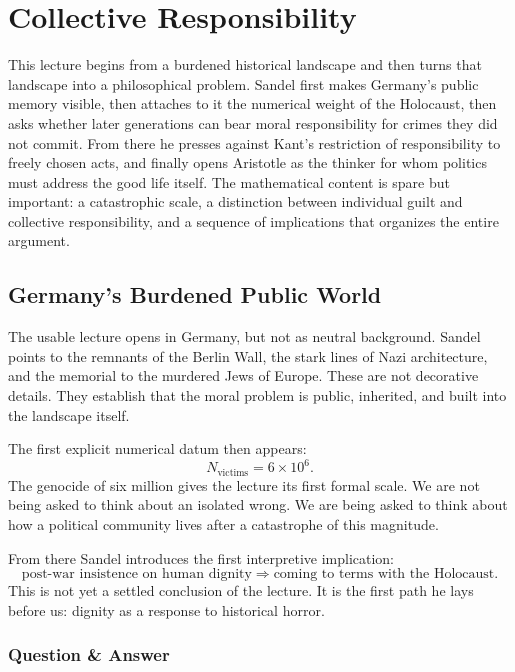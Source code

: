 \chapter{Collective Responsibility}

This lecture begins from a burdened historical landscape and then turns that landscape into a philosophical problem. Sandel first makes Germany's public memory visible, then attaches to it the numerical weight of the Holocaust, then asks whether later generations can bear moral responsibility for crimes they did not commit. From there he presses against Kant's restriction of responsibility to freely chosen acts, and finally opens Aristotle as the thinker for whom politics must address the good life itself. The mathematical content is spare but important: a catastrophic scale, a distinction between individual guilt and collective responsibility, and a sequence of implications that organizes the entire argument.

\section{Germany's Burdened Public World}

The usable lecture opens in Germany, but not as neutral background. Sandel points to the remnants of the Berlin Wall, the stark lines of Nazi architecture, and the memorial to the murdered Jews of Europe. These are not decorative details. They establish that the moral problem is public, inherited, and built into the landscape itself.

The first explicit numerical datum then appears:
\begin{equation}
N_{\text{victims}} = 6 \times 10^6.
\end{equation}
The genocide of six million gives the lecture its first formal scale. We are not being asked to think about an isolated wrong. We are being asked to think about how a political community lives after a catastrophe of this magnitude.

From there Sandel introduces the first interpretive implication:
\begin{equation}
\text{post-war insistence on human dignity}
\Longrightarrow
\text{coming to terms with the Holocaust}.
\end{equation}
This is not yet a settled conclusion of the lecture. It is the first path he lays before us: dignity as a response to historical horror.

\subsection{Question \& Answer}

